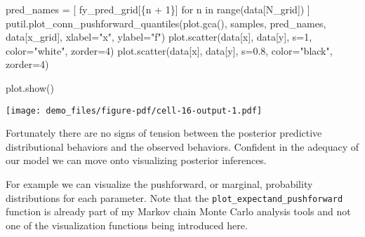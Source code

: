 \documentclass[
  letterpaper,
  DIV=11,
  numbers=noendperiod]{scrartcl}
\newenvironment{Shaded}{\begin{snugshade}}{\end{snugshade}}
\newcommand{\BuiltInTok}[1]{\textcolor[rgb]{0.00,0.23,0.31}{#1}}
\newcommand{\ControlFlowTok}[1]{\textcolor[rgb]{0.00,0.23,0.31}{#1}}
\newcommand{\DecValTok}[1]{\textcolor[rgb]{0.68,0.00,0.00}{#1}}
\newcommand{\FloatTok}[1]{\textcolor[rgb]{0.68,0.00,0.00}{#1}}
\newcommand{\KeywordTok}[1]{\textcolor[rgb]{0.00,0.23,0.31}{#1}}
\newcommand{\NormalTok}[1]{\textcolor[rgb]{0.00,0.23,0.31}{#1}}
\newcommand{\OperatorTok}[1]{\textcolor[rgb]{0.37,0.37,0.37}{#1}}
\newcommand{\SpecialCharTok}[1]{\textcolor[rgb]{0.37,0.37,0.37}{#1}}
\newcommand{\SpecialStringTok}[1]{\textcolor[rgb]{0.13,0.47,0.30}{#1}}
\newcommand{\StringTok}[1]{\textcolor[rgb]{0.13,0.47,0.30}{#1}}
\begin{document}
\begin{Shaded}
\begin{Highlighting}[]
\NormalTok{pred\_names }\OperatorTok{=}\NormalTok{ [ }\SpecialStringTok{f\textquotesingle{}y\_pred\_grid[}\SpecialCharTok{\{}\NormalTok{n }\OperatorTok{+} \DecValTok{1}\SpecialCharTok{\}}\SpecialStringTok{]\textquotesingle{}} \ControlFlowTok{for}\NormalTok{ n }\KeywordTok{in} \BuiltInTok{range}\NormalTok{(data[}\StringTok{\textquotesingle{}N\_grid\textquotesingle{}}\NormalTok{]) ]}
\NormalTok{putil.plot\_conn\_pushforward\_quantiles(plot.gca(), samples,}
\NormalTok{                                      pred\_names, data[}\StringTok{\textquotesingle{}x\_grid\textquotesingle{}}\NormalTok{],}
\NormalTok{                                      xlabel}\OperatorTok{=}\StringTok{"x"}\NormalTok{, ylabel}\OperatorTok{=}\StringTok{"f"}\NormalTok{)}
\NormalTok{plot.scatter(data[}\StringTok{\textquotesingle{}x\textquotesingle{}}\NormalTok{], data[}\StringTok{\textquotesingle{}y\textquotesingle{}}\NormalTok{], s}\OperatorTok{=}\DecValTok{1}\NormalTok{, color}\OperatorTok{=}\StringTok{"white"}\NormalTok{, zorder}\OperatorTok{=}\DecValTok{4}\NormalTok{)}
\NormalTok{plot.scatter(data[}\StringTok{\textquotesingle{}x\textquotesingle{}}\NormalTok{], data[}\StringTok{\textquotesingle{}y\textquotesingle{}}\NormalTok{], s}\OperatorTok{=}\FloatTok{0.8}\NormalTok{, color}\OperatorTok{=}\StringTok{"black"}\NormalTok{, zorder}\OperatorTok{=}\DecValTok{4}\NormalTok{)}

\NormalTok{plot.show()}
\end{Highlighting}
\end{Shaded}

\texttt{[image: demo\_files/figure-pdf/cell-16-output-1.pdf]}

Fortunately there are no signs of tension between the posterior
predictive distributional behaviors and the observed behaviors.
Confident in the adequacy of our model we can move onto visualizing
posterior inferences.

For example we can visualize the pushforward, or marginal, probability
distributions for each parameter. Note that the
\texttt{plot\_expectand\_pushforward} function is already part of my
Markov chain Monte Carlo analysis tools and not one of the visualization
functions being introduced here.
\end{document}
